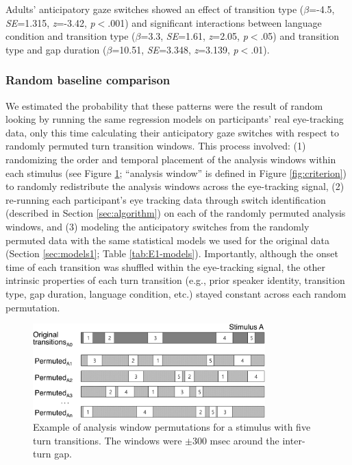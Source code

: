 \documentclass[authoryear, 12pt]{elsarticle}
\begin{document}
Adults' anticipatory gaze switches showed an effect of transition type (\textit{$\beta$}=-4.5, \textit{SE}=1.315, \textit{z}=-3.42, \textit{p}$<$.001) and significant interactions between language condition and transition type (\textit{$\beta$}=3.3, \textit{SE}=1.61, \textit{z}=2.05, \textit{p}$<$.05) and transition type and gap duration (\textit{$\beta$}=10.51, \textit{SE}=3.348, \textit{z}=3.139, \textit{p}$<$.01).

\subsubsection{Random baseline comparison}
\label{sec:randbaseline1}

We estimated the probability that these patterns were the result of random looking by running the same regression models on participants' real eye-tracking data, only this time calculating their anticipatory gaze switches with respect to randomly permuted turn transition windows. This process involved: (1) randomizing the order and temporal placement of the analysis windows within each stimulus (see Figure \ref{fig:shuffling}; ``analysis window'' is defined in Figure \ref{fig:criterion}) to randomly redistribute the analysis windows across the eye-tracking signal, (2) re-running each participant's eye tracking data through switch identification (described in Section \ref{sec:algorithm}) on each of the randomly permuted analysis windows, and (3) modeling the anticipatory switches from the randomly permuted data with the same statistical models we used for the original data (Section \ref{sec:models1}; Table \ref{tab:E1-models}). Importantly, although the onset time of each transition was shuffled within the eye-tracking signal, the other intrinsic properties of each turn transition (e.g., prior speaker identity, transition type, gap duration, language condition, etc.) stayed constant across each random permutation. 

\begin{figure}[t!]
\begin{center}
\includegraphics[width=0.8\textwidth]{figures/FIG-ShuffledWindows.png}
\end{center}
\caption{Example of analysis window permutations for a stimulus with five turn transitions. The windows were $\pm$300 msec around the inter-turn gap.} 
\label{fig:shuffling}
\end{figure}
\end{document}
